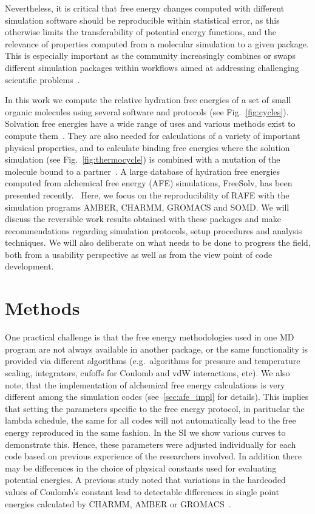 \documentclass[journal=jctcce,manuscript=article]{achemso}
\begin{document}
Nevertheless, it is critical that free energy
changes computed with different simulation software should be reproducible
within statistical error, as this otherwise limits the transferability of
potential energy functions, and the relevance of properties computed from a molecular simulation to a given package.  This is especially important as the community
increasingly combines or swaps different simulation packages within workflows
aimed at addressing challenging scientific
problems~\cite{Pronk:2011:CNP:2063384.2063465, doi:10.1021/ci8000937,
doi:10.1021/jp505332p, loeffler_fesetup:_2015,
DBLP:journals/corr/Balasubramanian16g}.

In this work we compute the relative hydration free energies of a
set of small organic molecules using several software and protocols (see Fig.~\ref{fig:cycles}).  Solvation free
energies have a wide range of uses and various methods exist to compute
them~\cite{Skyner:2015:PCCP}.  They are also needed for calculations of a
variety of important physical properties, and to calculate binding free
energies where the solution simulation  (see Fig.~\ref{fig:thermocycle}) is
combined with a mutation of the molecule bound to a
partner~\cite{Skyner:2015:PCCP}.  A large database of hydration free energies
computed from alchemical free energy (AFE) simulations, FreeSolv, has been
presented recently.~\cite{Mobley2014,doi:10.1021/acs.jced.7b00104} Here, we focus on the
reproducibility of RAFE with the simulation programs AMBER, CHARMM, GROMACS and
SOMD.  We will discuss the reversible work results obtained with these packages
and make recommendations regarding simulation protocols, setup procedures and
analysis techniques.  We will also deliberate on what needs to be done to
progress the field, both from a usability perspective as well as from the view
point of code development.


\section{Methods}
\label{sec:methods}

One practical challenge is that the free energy methodologies used in
one MD program are not always available in another package, or the
same functionality is provided via different algorithms
(e.g.\ algorithms for pressure and temperature scaling, integrators,
cufoffs for Coulomb and vdW interactions, etc).  We also note, that
the implementation of alchemical free energy calculations is very
different among the simulation codes (see~\ref{sec:afe_impl} for
details).  This implies that setting the parameters specific to the
free energy protocol, in parituclar the lambda schedule, the same for
all codes will not automatically lead to the free energy reproduced in
the same fashion.  In the SI we show various curves to demonstrate this.
Hence, these parameters were adjusted individually for each code based
on previous experience of the researchers involved.  In addition there
may be differences in the choice of physical constants used for
evaluating potential energies.  A previous study noted that variations
in the hardcoded values of Coulomb's constant lead to detectable
differences in single point energies calculated by CHARMM, AMBER or
GROMACS~\cite{Shirts2017, SOMDcoulomb}.
\end{document}
